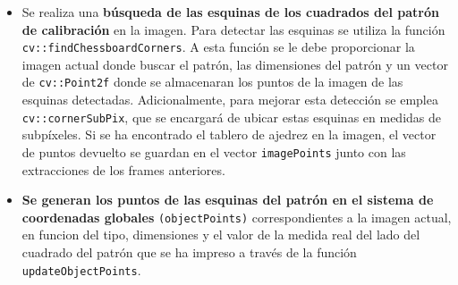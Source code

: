 \begin{itemize}

\item Se realiza una \textbf{búsqueda de las esquinas de los cuadrados del patrón de calibración} en la imagen. Para detectar las esquinas se utiliza la función \texttt{cv::findChessboardCorners}. A esta función se le debe proporcionar la imagen actual donde buscar el patrón, las dimensiones del patrón y un vector de \texttt{cv::Point2f} donde se almacenaran los puntos de la imagen de las esquinas detectadas. Adicionalmente, para mejorar esta detección se emplea \texttt{cv::cornerSubPix}, que se encargará de ubicar estas esquinas en medidas de subpíxeles. Si se ha encontrado el tablero de ajedrez en la imagen, el vector de puntos devuelto se guardan en el vector \texttt{imagePoints} junto con las extracciones de los frames anteriores.  

%
%    
%  

\item \textbf{Se generan los puntos de las esquinas del patrón en el sistema de coordenadas globales} \texttt{(objectPoints)} correspondientes a la imagen actual, en funcion del tipo, dimensiones y el valor de la medida real del lado del cuadrado del patrón que se ha impreso a través de la función \texttt{updateObjectPoints}.


\end{itemize}
